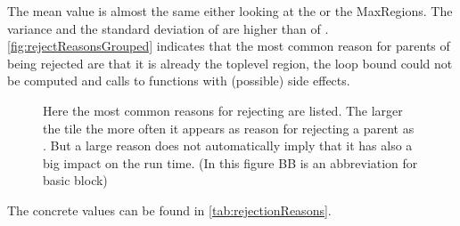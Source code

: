 The mean value is almost the same either looking at the \scops or the MaxRegions.
The variance and the standard deviation of \dyncovp are higher than of \dyncovs.\\
\autoref{fig:rejectReasonsGrouped} indicates that the most common reason for parents of \scops being rejected are that it is already the toplevel region, the loop bound could not be computed and calls to functions with (possible) side effects.
\begin{figure}[!h]
    \caption[Reasons for rejecting SCoPs]{
        Here the most common reasons for rejecting are listed.
        The larger the tile the more often it appears as reason for rejecting a parent as \scop.
        But a large reason does not automatically imply that it has also a big impact on the run time.
        (In this figure BB is an abbreviation for basic block)
    }
    
    \label{fig:rejectReasonsGrouped}
\end{figure}
The concrete values can be found in \autoref{tab:rejectionReasons}.

